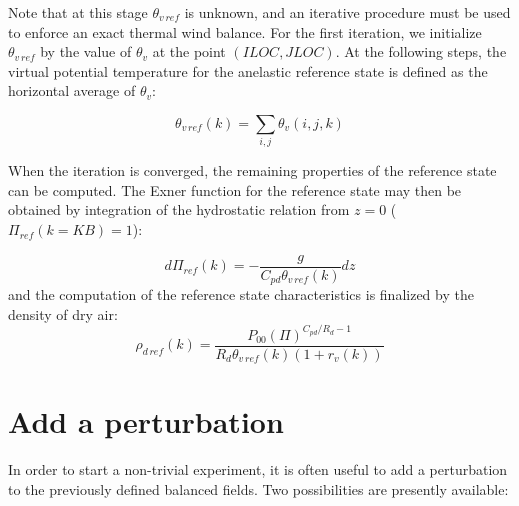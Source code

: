Note that at this stage $\theta_{v\,ref}$ is unknown, and an iterative
procedure must be used to enforce an exact
 thermal wind balance. For the first iteration, we initialize
$\theta_{v\,ref}$ by the value of $\theta_{v}$ at the point
$(ILOC,JLOC)$. At the following steps,
the virtual potential temperature for the anelastic reference state
is defined as the horizontal average of $\theta_{v}$:

$$
\theta_{v\,ref}(k) = \sum _{i,j} \theta_{v}(i,j,k)
$$

When the iteration is converged,
the remaining properties of the reference state can be computed.
The Exner function for the
reference state may then be obtained by integration of the hydrostatic relation
from $z=0$ ($\Pi_{ref} (k=KB) =1$):

$$
d \Pi_{ref}(k) = - \dfrac{g}{C_{pd} \theta_{v\,ref}(k)}  dz
$$
and the computation of the reference state characteristics is finalized
by the density of dry air:
$$
\rho_{d\,ref}(k) = \dfrac{P_{00} (\Pi)^{C_{pd}/R_d - 1} }{R_{d}
\theta_{v\,ref}(k) \left(1+r_{v}(k) \right) }
$$
\section{Add a perturbation}

In order to start a non-trivial experiment, it is often useful to add
a perturbation to the previously defined balanced fields. Two possibilities
are presently available:

